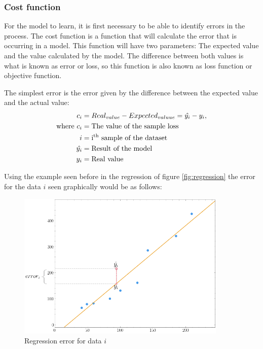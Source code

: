\subsubsection{Cost function}\label{costfunction}

For the model to learn, it is first necessary to be able to identify errors in the process. The cost function is a function that will calculate the error that is occurring in a model. This function will have two parameters: The expected value and the value calculated by the model. The difference between both values is what is known as error or loss, so this function is also known as loss function or objective function.
\newline

The simplest error is the error given by the difference between the expected value and the actual value:
\newline
\begin{equation}
    \begin{split}
    c_i & = Real_{value} - Expected_{valuue} = \hat{y_i} - y_i, \\ 
    \text{where}~c_i &= \text{The value of the sample loss} \\
    i &= \text{i\textsuperscript{th} sample of the dataset} \\
    ~\hat{y_i} &= \text{Result of the model} \\
    ~y_i &= \text{Real value}
  \end{split}
\end{equation}

Using the example seen before in the regression of figure \ref{fig:regression} the error for the data $i$ seen graphically would be as follows:

\begin{figure}[H]
    \centering
    \includegraphics[width=10cm]{images/state-of-art/cost-function/error_function.png}
    \caption{Regression error for data $i$}
    \label{fig:error_regression}
\end{figure}

